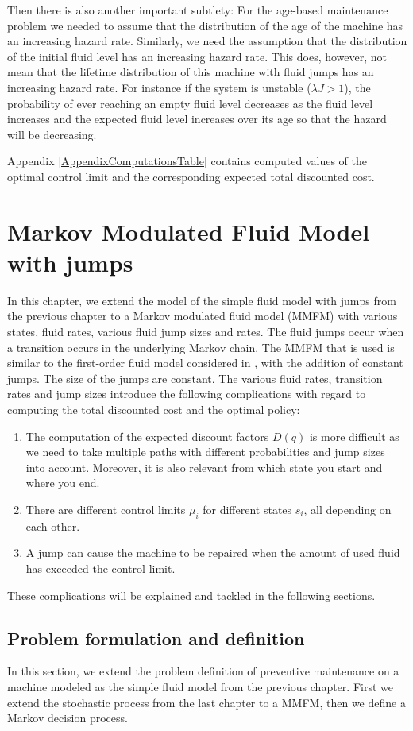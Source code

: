 \documentclass[a4paper]{thesis}
\theoremstyle{definition}
\begin{document}
Then there is also another important subtlety: For the age-based maintenance problem we needed to assume that the distribution of the age of the machine has an increasing hazard rate.
Similarly, we need the assumption that the distribution of the initial fluid level has an increasing hazard rate.
This does, however, not mean that the lifetime distribution of this machine with fluid jumps has an increasing hazard rate.
For instance if the system is unstable ($\lambda J>1$), the probability of ever reaching an empty fluid level decreases as the fluid level increases and the expected fluid level increases over its age so that the hazard will be decreasing.

Appendix \ref{AppendixComputationsTable} contains computed values of the optimal control limit and the corresponding expected total discounted cost. 
\chapter{Markov Modulated Fluid Model with jumps}\label{chapter:Mmfm}
In this chapter, we extend the model of the simple fluid model with jumps from the previous chapter to a Markov modulated fluid model (MMFM) with various states, fluid rates, various fluid jump sizes and rates.
The fluid jumps occur when a transition occurs in the underlying Markov chain.
The MMFM that is used is similar to the first-order fluid model considered in \cite{Gribaudo2007}, with the addition of constant jumps.
The size of the jumps are constant.
The various fluid rates, transition rates and jump sizes introduce the following complications with regard to computing the total discounted cost and the optimal policy:
\begin{enumerate}
	\item The computation of the expected discount factors $D(q)$ is more difficult as we need to take multiple
	paths with different probabilities and jump sizes into account.
	Moreover, it is also relevant from which state you start and where you end.
	\item There are different control limits $\mu_i$ for different states $s_i$, all depending on each other.
	\item A jump can cause the machine to be repaired when the amount of used fluid has exceeded the control limit.
\end{enumerate}
These complications will be explained and tackled in the following sections.
\section{Problem formulation and definition}
In this section, we extend the problem definition of preventive maintenance on a machine modeled as the simple fluid model from the previous chapter.
First we extend the stochastic process from the last chapter to a MMFM, then we define a Markov decision process.
\end{document}
